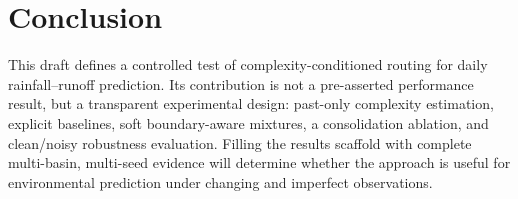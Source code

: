 \documentclass[11pt]{article}
\begin{document}
\section{Conclusion}
This draft defines a controlled test of complexity-conditioned routing for daily rainfall--runoff prediction. Its contribution is not a pre-asserted performance result, but a transparent experimental design: past-only complexity estimation, explicit baselines, soft boundary-aware mixtures, a consolidation ablation, and clean/noisy robustness evaluation. Filling the results scaffold with complete multi-basin, multi-seed evidence will determine whether the approach is useful for environmental prediction under changing and imperfect observations.
\end{document}
